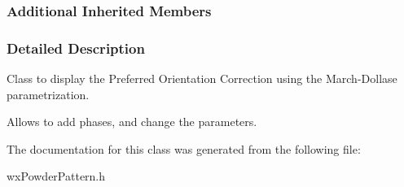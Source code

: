 \subsubsection*{Additional Inherited Members}


\subsubsection{Detailed Description}
Class to display the Preferred Orientation Correction using the March-\/\-Dollase parametrization. 

Allows to add phases, and change the parameters. 

The documentation for this class was generated from the following file\-:\begin{DoxyCompactItemize}
\item 
wx\-Powder\-Pattern.\-h\end{DoxyCompactItemize}
